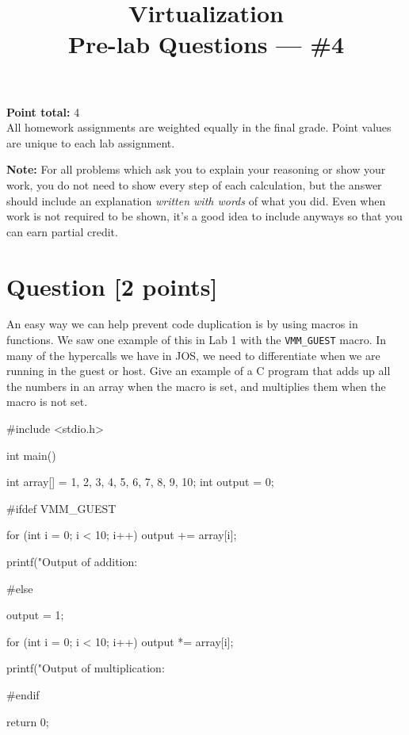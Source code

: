 \documentclass[11pt]{article}
\providecommand{\due}{}
\begin{document}
\title{Virtualization\\Pre-lab Questions --- \#4}
\date{\due}

\maketitle

\noindent \textbf{Point total:} 4
\\ All homework assignments are weighted equally in the final grade. Point values are unique to each lab assignment.

\textbf{Note:} For all problems which ask you to explain your reasoning or show your work, you do not need to show every step of each calculation, but the answer should include an explanation \emph{written with words} of what you did.  Even when work is not required to be shown, it’s a good idea to include anyways so that you can earn partial credit.

\section{Question [2 points]}

An easy way we can help prevent code duplication is by using macros in functions. We saw one example of this in Lab 1 with the \texttt{VMM\_GUEST} macro. In many of the hypercalls we have in JOS, we need to differentiate when we are running in the guest or host. Give an example of a C program that adds up all the numbers in an array when the macro is set, and multiplies them when the macro is not set.

\begin{solution}
#include <stdio.h>

int main() {
    
    int array[] = {1, 2, 3, 4, 5, 6, 7, 8, 9, 10};
    int output = 0;

#ifdef VMM_GUEST
    
    for (int i = 0; i < 10; i++) {
        output += array[i];
    }
    
    printf("Output of addition: %

#else

    output = 1;
    
    for (int i = 0; i < 10; i++) {
        output *= array[i];
    }

    printf("Output of multiplication: %

#endif

    return 0;

}
\end{solution}
\end{document}
